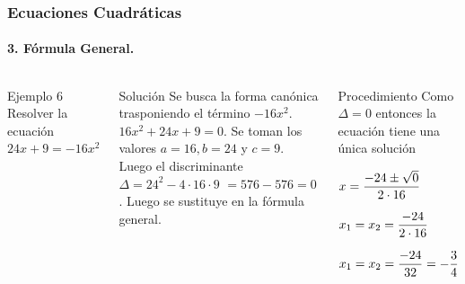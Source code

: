 \documentclass[mathserif]{beamer}
\begin{document}
\begin{frame}
\frametitle{\bf Ecuaciones Cuadráticas} 
\framesubtitle{3. Fórmula General.}

    \begin{columns}
        \begin{exampleblock}{Ejemplo 6}
        \bc
        Resolver la ecuación $24x+9=-16x^2$
        \ec
        \end{exampleblock}
\pause
        \begin{block}{Solución}
        Se busca la forma canónica trasponiendo el término \alert<2>{$-16x^2$}. $16x^2+24x+9=0$. Se toman los valores $a=16, b=24$ y $c=9$. Luego el discriminante $\Delta=24^2-4\cdot 16\cdot 9$ $=576-576=0$. Luego se sustituye en la fórmula general.
        \end{block}
\pause
        \begin{block}{Procedimiento}
            \alert<3> {Como $\Delta=0$ entonces la ecuación tiene una única solución}
            \benu
            \item[] <4-| alert@4>$\displaystyle x=\frac{-24\pm\sqrt{0}}{2\cdot 16}$
            \item[] <5-| alert@5>$\displaystyle x_1=x_2=\frac{-24}{2\cdot 16}$
            \item[] <6-| alert@6>$\displaystyle x_1=x_2=\frac{-24}{32}=-\frac34$
            \eenu
            \pause
        \end{block}
    \end{columns}
\end{frame}
\end{document}
